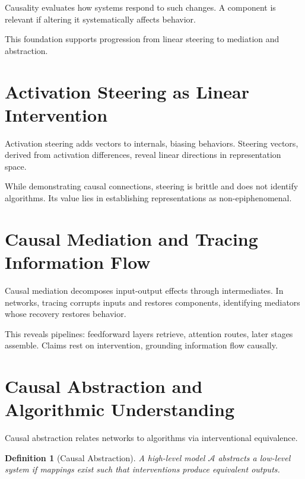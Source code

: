 \documentclass[11pt]{article}
\newtheorem{definition}{Definition}
\theoremstyle{remark}
\newcommand{\Alg}{\mathcal{A}}
\begin{document}
Causality evaluates how systems respond to such changes. A component is relevant if altering it systematically affects behavior.

This foundation supports progression from linear steering to mediation and abstraction.

\section{Activation Steering as Linear Intervention}

Activation steering adds vectors to internals, biasing behaviors. Steering vectors, derived from activation differences, reveal linear directions in representation space.

While demonstrating causal connections, steering is brittle and does not identify algorithms. Its value lies in establishing representations as non-epiphenomenal.

\section{Causal Mediation and Tracing Information Flow}

Causal mediation decomposes input-output effects through intermediates. In networks, tracing corrupts inputs and restores components, identifying mediators whose recovery restores behavior.

This reveals pipelines: feedforward layers retrieve, attention routes, later stages assemble. Claims rest on intervention, grounding information flow causally.

\section{Causal Abstraction and Algorithmic Understanding}

Causal abstraction relates networks to algorithms via interventional equivalence.

\begin{definition}[Causal Abstraction]
A high-level model $\Alg$ abstracts a low-level system if mappings exist such that interventions produce equivalent outputs.
\end{definition}
\end{document}
